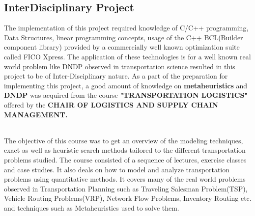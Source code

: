 \documentclass[a4paper, 12pt]{article}
\begin{document}
\subsection{InterDisciplinary Project}
The implementation of this project required knowledge of C/C++ programming, Data Structures, linear programming concepts, usage of the C++ BCL(Builder component library) provided by a commercially well known optimization suite called FICO Xpress. The application of these technologies is for a well known real world problem like DNDP observed in transportation science resulted in this project to be of Inter-Disciplinary nature. As a part of the preparation for implementing this project, a good amount of knowledge on \textbf{metaheuristics} and \textbf{DNDP} was acquired from the course \textbf{"TRANSPORTATION LOGISTICS"} offered by the \textbf{CHAIR OF LOGISTICS AND SUPPLY CHAIN MANAGEMENT.}\par
\noindent
\\
The objective of this course was to get an overview of the modeling techniques, exact as well as heuristic search methods tailored to the different transportation problems studied. The course consisted of a sequence of lectures, exercise classes and case studies. It also deals on how to model and analyze transportation problems using quantitative methods. It covers many of the real world problems observed in Transportation Planning such as Traveling Salesman Problem(TSP), Vehicle Routing Problems(VRP), Network Flow Problems, Inventory Routing etc. and techniques such as Metaheuristics used to solve them.\par
\end{document}
